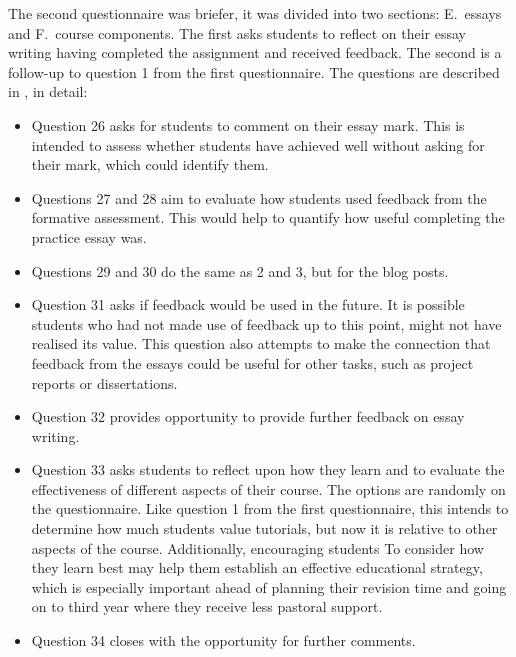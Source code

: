 The second questionnaire was briefer, it was divided into two sections: E.\ essays and F.\ course components. The first asks students to reflect on their essay writing having completed the assignment and received feedback. The second is a follow-up to question 1 from the first questionnaire. The questions are described in , in detail:
\begin{itemize}
\item Question 26 asks for students to comment on their essay mark. This is intended to assess whether students have achieved well without asking for their mark, which could identify them.
\item Questions 27 and 28 aim to evaluate how students used feedback from the formative assessment. This would help to quantify how useful completing the practice essay was.
\item Questions 29 and 30 do the same as 2 and 3, but for the blog posts.
\item Question 31 asks if feedback would be used in the future. It is possible students who had not made use of feedback up to this point, might not have realised its value. This question also attempts to make the connection that feedback from the essays could be useful for other tasks, such as project reports or dissertations.
\item Question 32 provides opportunity to provide further feedback on essay writing.
\item Question 33 asks students to reflect upon how they learn and to evaluate the effectiveness of different aspects of their course. The options are randomly on the questionnaire. Like question 1 from the first questionnaire, this intends to determine how much students value tutorials, but now it is relative to other aspects of the course. Additionally, encouraging students To consider how they learn best may help them establish an effective educational strategy, which is especially important ahead of planning their revision time and going on to third year where they receive less pastoral support.
\item Question 34 closes with the opportunity for further comments.
\end{itemize}
